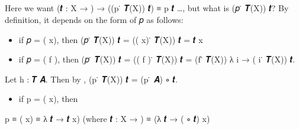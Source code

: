 \begin{code}
\AgdaSymbol{:}%
\>[154I]\AgdaSymbol{\{}\AgdaSpace{}%
\AgdaSpace{}%
\AgdaSymbol{:}\AgdaSpace{}%
\AgdaSymbol{\}\{}\AgdaSpace{}%
\AgdaSymbol{:}\AgdaSpace{}%
\AgdaSpace{}%
\AgdaSpace{}%
\AgdaSymbol{\}}\<%
\\
\>[.][@{}l@{}]\<[154I]%
\>[26]\AgdaSymbol{(}\AgdaSpace{}%
\AgdaSymbol{:}\AgdaSpace{}%
\AgdaSpace{}%
\AgdaSpace{}%
\AgdaSymbol{)(}\AgdaSpace{}%
\AgdaSymbol{:}\AgdaSpace{}%
\AgdaSpace{}%
\AgdaSpace{}%
\AgdaSpace{}%
\AgdaSpace{}%
\AgdaSymbol{)(}\AgdaSpace{}%
\AgdaSymbol{:}\AgdaSpace{}%
\AgdaSymbol{)}\<%
\\
\>[0][@{}l@{\AgdaIndent{0}}]%
\>[1]%
\>[26]\AgdaSymbol{(}\AgdaSpace{}%
\AgdaSpace{}%
\AgdaSymbol{)}\AgdaSpace{}%
\AgdaSpace{}%
\AgdaSpace{}%
\AgdaSpace{}%
\AgdaSpace{}%
\AgdaSpace{}%
\AgdaSpace{}%
\AgdaSpace{}%
\<%
\\
%
\\[\AgdaEmptyExtraSkip]%
\>[0]\AgdaSpace{}%
\AgdaSymbol{=}\AgdaSpace{}%
\<%
\end{code}
\ccpad
Here we want (\ab 𝒕 \as : \ab X \as → ) \as → ((\ab p \af ̇ \af 𝑻(\ab X)) \ab 𝒕) \ad ≡ \ab p \ab 𝒕 …, but what is (\ab 𝑝 \af ̇ \af 𝑻(\ab X)) \ab 𝒕?  By definition, it depends on the form of \ab 𝑝 as follows:
\begin{itemize}
\item
  if \ab 𝑝 \as = ( \ab x), then (\ab 𝑝 \af ̇ \af 𝑻(\ab X)) \ab 𝒕 \as = (( \ab x) \af ̇ \af 𝑻(\ab X)) \ab 𝒕 \as = \ab 𝒕 \ab x
\item
  if \ab 𝑝 \as = ( \ab f ), then (\ab 𝑝 \af ̇ \af 𝑻(\ab X)) \ab 𝒕 \as = (( \ab f ) \af ̇ \af 𝑻(\ab X)) \ab 𝒕 \as = (\ab f \af ̂ \af 𝑻(\ab X)) \as λ \ab i \as → ( \ab i \af ̇ \af 𝑻(\ab X)) \ab 𝒕.
\end{itemize}
Let \ab h \as :  \af 𝑻 \ab 𝑨. Then by ,  (\ab p \af ̇ \af 𝑻(\ab X)) \ab 𝒕 \as = (\ab p \af ̇ \ab 𝑨)  \af ∘ \ab 𝒕.
\begin{itemize}
\item
  if \ab p \as = ( \ab x), then
\end{itemize}
 \ab p \ad ≡  ( \ab x) \ad ≡ \as λ \ab 𝒕 \as → \ab 𝒕 \ab x) (where \ab 𝒕 \as : \ab X \as → ) \ad ≡ (\as λ \ab 𝒕 \as → ( \af ∘ \ab 𝒕) \ab x)

